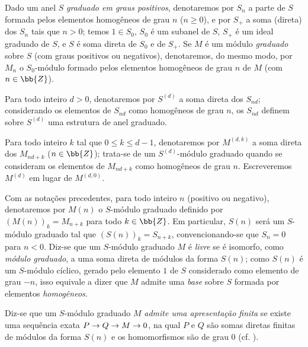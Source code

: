 \documentclass[oneside,10pt]{amsart}
\makeatletter
\renewcommand{\leq}{\leqslant}
\renewcommand{\geq}{\geqslant}
\newcommand{\ega@arrow}[2]{\mathchoice{#1}{#2}{#2}{#2}}
\renewcommand{\to}{\ega@arrow{\longrightarrow}{\rightarrow}}
\newcommand{\oldpage}[2][]{\marginnote{\normalfont\footnotesize\textbf{#1}~|~#2}\ignorespaces}
\let\EGAOriginalLabel\label
\renewcommand{\label}[1]{\phantomsection\EGAOriginalLabel{#1}}
\makeatother
\begin{document}
\begin{notation}[2.1.1]
\label{II.2.1.1}
Dado um anel $S$ \emph{graduado em graus positivos}, denotaremos por $S_n$ a parte de $S$ formada pelos elementos homogêneos de grau $n$ ($n\geq0$), e por $S_+$ a soma (direta) dos $S_n$ tais que $n>0$; temos $1\in S_0$, $S_0$ é um subanel de $S$, $S_+$ é um ideal graduado de $S$, e $S$ é soma direta de $S_0$ e de $S_+$.
Se $M$ é um módulo \emph{graduado} sobre $S$ (com graus positivos ou negativos), denotaremos, do mesmo modo, por $M_n$ o $S_0$-módulo formado pelos elementos homogêneos de grau $n$ de $M$ (com $n\in\bb{Z}$).

Para todo inteiro $d>0$, denotaremos por $S^{(d)}$ a soma direta dos $S_{nd}$; considerando os elementos de $S_{nd}$ como homogêneos de grau $n$, os $S_{nd}$ definem sobre $S^{(d)}$ uma estrutura de anel graduado.

Para todo inteiro $k$ tal que $0\leq k\leq d-1$, denotaremos por $M^{(d,k)}$ a soma direta
\oldpage[II]{20}
dos $M_{nd+k}$ ($n\in\bb{Z}$); trata-se de um $S^{(d)}$-módulo graduado quando se consideram os elementos de $M_{nd+k}$ como homogêneos de grau $n$.
Escreveremos $M^{(d)}$ em lugar de $M^{(d,0)}$.

Com as notações precedentes, para todo inteiro $n$ (positivo ou negativo), denotaremos por $M(n)$ o $S$-módulo graduado definido por $(M(n))_k=M_{n+k}$ para todo $k\in\bb{Z}$.
Em particular, $S(n)$ será um $S$-módulo graduado tal que $(S(n))_k=S_{n+k}$, convencionando-se que $S_n=0$ para $n<0$.
Diz-se que um $S$-módulo graduado $M$ é \emph{livre} se é isomorfo, como \emph{módulo graduado}, a uma soma direta de módulos da forma $S(n)$; como $S(n)$ é um $S$-módulo cíclico, gerado pelo elemento $1$ de $S$ considerado como elemento de grau $-n$, isso equivale a dizer que $M$ admite uma \emph{base} sobre $S$ formada por elementos \emph{homogêneos}.

Diz-se que um $S$-módulo graduado $M$ \emph{admite uma apresentação finita} se existe uma sequência exata $P\to Q\to M\to0$, na qual $P$ e $Q$ são somas diretas finitas de módulos da forma $S(n)$ e os homomorfismos são de grau $0$ (cf. ).
\end{notation}
\end{document}
